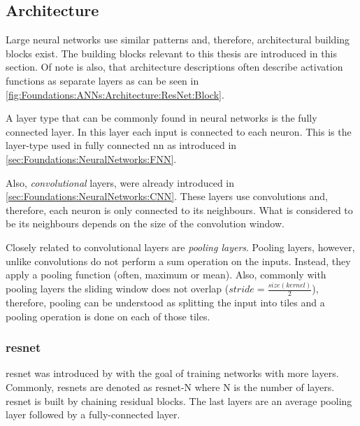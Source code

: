 \subsection{Architecture}
\label{sec:Foundations:NeuralNetworks:Architecture}

Large neural networks use similar patterns and, therefore, architectural building blocks exist. The building blocks relevant to this thesis are introduced in this section.
Of note is also, that architecture descriptions often describe activation functions as separate layers as can be seen in \autoref{fig:Foundations:ANNs:Architecture:ResNet:Block}.

A layer type that can be commonly found in neural networks is the fully connected layer. In this layer each input is connected to each neuron. This is the layer-type used in fully connected \ac{nn} as introduced in \autoref{sec:Foundations:NeuralNetworks:FNN}.

Also, \emph{convolutional} layers, were already introduced in \autoref{sec:Foundations:NeuralNetworks:CNN}. These layers use convolutions and, therefore, each neuron is only connected to its neighbours. What is considered to be its neighbours depends on the size of the convolution window.

Closely related to convolutional layers are \emph{pooling layers}. Pooling layers, however, unlike convolutions do not perform a sum operation on the inputs. Instead, they apply a pooling function (often, maximum or mean). Also, commonly with pooling layers the sliding window does not overlap ($stride = \frac{size(kernel)}{2}$), therefore, pooling can be understood as splitting the input into tiles and a pooling operation is done on each of those tiles. 



\subsubsection{\acs{resnet}}
\label{sec:Foundations:NeuralNetworks:Architecture:ResNet}

\Ac{resnet} was introduced by \textcite{he2016deep} with the goal of training networks with more layers. Commonly, \acp{resnet} are denoted as \acs{resnet}-N where N is the number of layers. \Ac{resnet} is built by chaining residual blocks. The last layers are an average pooling layer followed by a fully-connected layer.

